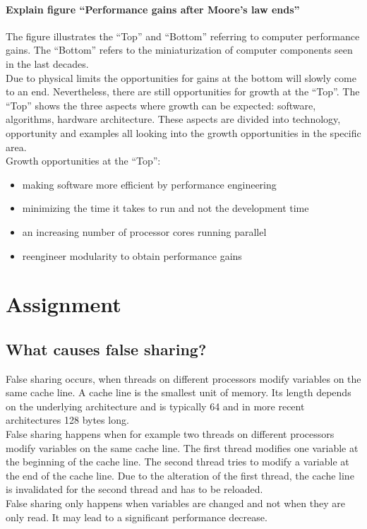 \documentclass[runningheads]{llncs}
\begin{document}
\paragraph{Explain figure “Performance gains after Moore’s law ends”}
The figure illustrates the “Top” and “Bottom” referring to computer performance gains. The “Bottom” refers to the miniaturization of computer components seen in the last decades. \\
Due to physical limits the opportunities for gains at the bottom will slowly come to an end. Nevertheless, there are still opportunities for growth at the “Top”. The “Top” shows the three aspects where growth can be expected: software, algorithms, hardware architecture. These aspects are divided into technology, opportunity and examples all looking into the growth opportunities in the specific area.
\\
Growth opportunities at the “Top”:
\begin{itemize}
	\item making software more efficient by performance engineering
	\item minimizing the time it takes to run and not the development time
	\item an increasing number of processor cores running parallel
	\item reengineer modularity to obtain performance gains
\end{itemize}


\section{Assignment}

\subsection{What causes false sharing?}
False sharing occurs, when threads on different processors modify variables on the same cache line. A cache line is the smallest unit of memory. Its length depends on the underlying architecture and is typically 64 and in more recent architectures 128 bytes long.
\\
False sharing happens when for example two threads on different processors modify variables on the same cache line. The first thread modifies one variable at the beginning of the cache line. The second thread tries to modify a variable at the end of the cache line. Due to the alteration of the first thread, the cache line is invalidated for the second thread and has to be reloaded.
\\
False sharing only happens when variables are changed and not when they are only read. It may lead to a significant performance decrease.
\end{document}
